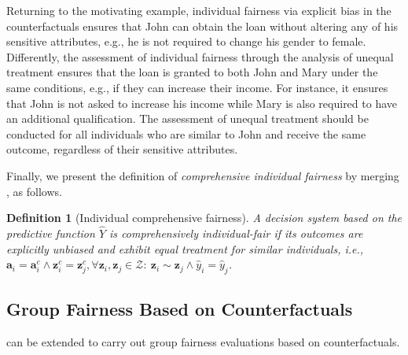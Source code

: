 \documentclass[letterpaper]{article} %
\newtheorem{definition}{Definition}
\begin{document}
Returning to the motivating example, individual fairness via explicit bias in the counterfactuals ensures that John can obtain the loan without altering any of his sensitive attributes, e.g., he is not required to change his gender to female.
%
Differently, the assessment of individual fairness through the analysis of unequal treatment ensures that the loan is granted to both John and Mary under the same conditions, e.g., if they can increase their income. For instance, it ensures that John is not asked to increase his income while Mary is also required to have an additional qualification.
%
The assessment of unequal treatment should be conducted for all individuals who are similar to John and receive the same outcome, regardless of their sensitive attributes.

Finally, we present the definition of \emph{comprehensive individual fairness} by merging , as follows.
%
\begin{definition}[Individual comprehensive fairness]\label{comprehensive}
	A decision system based on the predictive function $\hat{Y}$ is \emph{comprehensively individual-fair} if its outcomes are explicitly unbiased and exhibit equal treatment for similar individuals, i.e., $\boldsymbol{a}_i = \boldsymbol{a}_i^c \wedge \boldsymbol{z}_i^c = \boldsymbol{z}_j^c, \forall \boldsymbol{z}_i, \boldsymbol{z}_j \in \mathcal{Z} : ~ \boldsymbol{z}_i \sim \boldsymbol{z}_j \wedge \hat{y}_i = \hat{y}_j $.
\end{definition}

\subsection{Group Fairness Based on Counterfactuals}

 can be extended to carry out group fairness evaluations based on counterfactuals.
\end{document}
